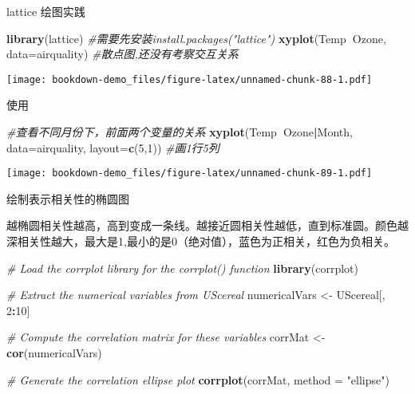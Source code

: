 \documentclass[]{book}
\newenvironment{Shaded}{\begin{snugshade}}{\end{snugshade}}
\newcommand{\CommentTok}[1]{\textcolor[rgb]{0.56,0.35,0.01}{\textit{#1}}}
\newcommand{\DataTypeTok}[1]{\textcolor[rgb]{0.13,0.29,0.53}{#1}}
\newcommand{\DecValTok}[1]{\textcolor[rgb]{0.00,0.00,0.81}{#1}}
\newcommand{\KeywordTok}[1]{\textcolor[rgb]{0.13,0.29,0.53}{\textbf{#1}}}
\newcommand{\NormalTok}[1]{#1}
\newcommand{\OperatorTok}[1]{\textcolor[rgb]{0.81,0.36,0.00}{\textbf{#1}}}
\newcommand{\StringTok}[1]{\textcolor[rgb]{0.31,0.60,0.02}{#1}}
\begin{document}
lattice 绘图实践

\begin{Shaded}
\begin{Highlighting}[]
\KeywordTok{library}\NormalTok{(lattice) }\CommentTok{#需要先安装install.packages("lattice")}
\KeywordTok{xyplot}\NormalTok{(Temp}\OperatorTok{~}\NormalTok{Ozone, }\DataTypeTok{data=}\NormalTok{airquality) }\CommentTok{#散点图,还没有考察交互关系}
\end{Highlighting}
\end{Shaded}

\texttt{[image: bookdown-demo\_files/figure-latex/unnamed-chunk-88-1.pdf]}

\begin{Shaded}
\end{Shaded}

使用

\begin{Shaded}
\begin{Highlighting}[]
\CommentTok{#查看不同月份下，前面两个变量的关系}
\KeywordTok{xyplot}\NormalTok{(Temp}\OperatorTok{~}\NormalTok{Ozone}\OperatorTok{|}\NormalTok{Month, }\DataTypeTok{data=}\NormalTok{airquality,}
       \DataTypeTok{layout=}\KeywordTok{c}\NormalTok{(}\DecValTok{5}\NormalTok{,}\DecValTok{1}\NormalTok{)) }\CommentTok{#画1行5列}
\end{Highlighting}
\end{Shaded}

\texttt{[image: bookdown-demo\_files/figure-latex/unnamed-chunk-89-1.pdf]}

绘制表示相关性的椭圆图

越椭圆相关性越高，高到变成一条线。越接近圆相关性越低，直到标准圆。颜色越深相关性越大，最大是1,最小的是0（绝对值），蓝色为正相关，红色为负相关。

\begin{Shaded}
\begin{Highlighting}[]
\CommentTok{# Load the corrplot library for the corrplot() function}
\KeywordTok{library}\NormalTok{(corrplot)}

\CommentTok{# Extract the numerical variables from UScereal}
\NormalTok{numericalVars <-}\StringTok{ }\NormalTok{UScereal[, }\DecValTok{2}\OperatorTok{:}\DecValTok{10}\NormalTok{]}

\CommentTok{# Compute the correlation matrix for these variables}
\NormalTok{corrMat <-}\StringTok{ }\KeywordTok{cor}\NormalTok{(numericalVars)}

\CommentTok{# Generate the correlation ellipse plot}
\KeywordTok{corrplot}\NormalTok{(corrMat, }\DataTypeTok{method =} \StringTok{"ellipse"}\NormalTok{)}
\end{Highlighting}
\end{Shaded}
\end{document}
